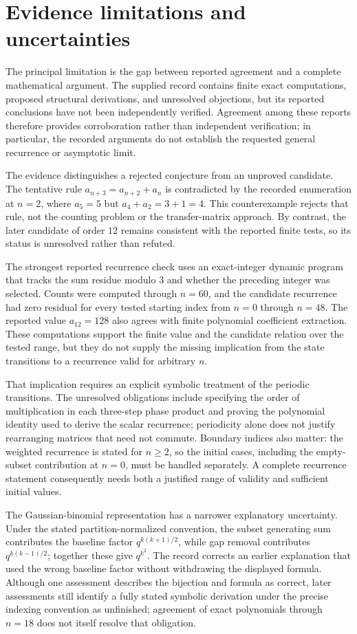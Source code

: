 \documentclass[11pt]{article}
\begin{document}
\section{Evidence limitations and uncertainties}
The principal limitation is the gap between reported agreement and a complete mathematical argument. The supplied record contains finite exact computations, proposed structural derivations, and unresolved objections, but its reported conclusions have not been independently verified. Agreement among these reports therefore provides corroboration rather than independent verification; in particular, the recorded arguments do not establish the requested general recurrence or asymptotic limit.

The evidence distinguishes a rejected conjecture from an unproved candidate. The tentative rule $a_{n+3}=a_{n+2}+a_n$ is contradicted by the recorded enumeration at $n=2$, where $a_5=5$ but $a_4+a_2=3+1=4$. This counterexample rejects that rule, not the counting problem or the transfer-matrix approach. By contrast, the later candidate of order $12$ remains consistent with the reported finite tests, so its status is unresolved rather than refuted.

The strongest reported recurrence check uses an exact-integer dynamic program that tracks the sum residue modulo $3$ and whether the preceding integer was selected. Counts were computed through $n=60$, and the candidate recurrence had zero residual for every tested starting index from $n=0$ through $n=48$. The reported value $a_{12}=128$ also agrees with finite polynomial coefficient extraction. These computations support the finite value and the candidate relation over the tested range, but they do not supply the missing implication from the state transitions to a recurrence valid for arbitrary $n$.

That implication requires an explicit symbolic treatment of the periodic transitions. The unresolved obligations include specifying the order of multiplication in each three-step phase product and proving the polynomial identity used to derive the scalar recurrence; periodicity alone does not justify rearranging matrices that need not commute. Boundary indices also matter: the weighted recurrence is stated for $n\geq 2$, so the initial cases, including the empty-subset contribution at $n=0$, must be handled separately. A complete recurrence statement consequently needs both a justified range of validity and sufficient initial values.

The Gaussian-binomial representation has a narrower explanatory uncertainty. Under the stated partition-normalized convention, the subset generating sum contributes the baseline factor $q^{k(k+1)/2}$, while gap removal contributes $q^{k(k-1)/2}$; together these give $q^{k^2}$. The record corrects an earlier explanation that used the wrong baseline factor without withdrawing the displayed formula. Although one assessment describes the bijection and formula as correct, later assessments still identify a fully stated symbolic derivation under the precise indexing convention as unfinished; agreement of exact polynomials through $n=18$ does not itself resolve that obligation.
\end{document}
